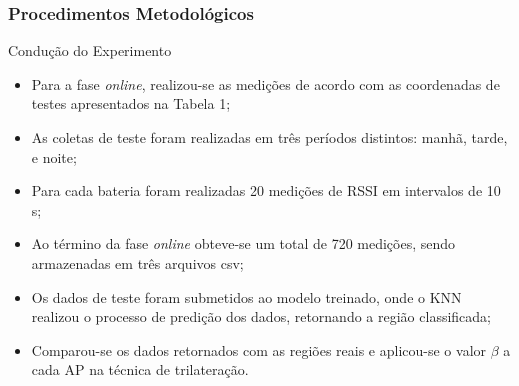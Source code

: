 \documentclass[xcolor={dvipsnames,svgnames,table}]{beamer}
\begin{document}
	\begin{frame}
		\frametitle{Procedimentos Metodológicos}	
		\begin{block}{Condução do Experimento}
			\begin{itemize}[label=\textcolor{black}{\textbullet}, left=5pt]
				\justifying
				\item Para a fase \textit{online}, realizou-se as medições de acordo com as coordenadas de testes apresentados na Tabela 1;%
				\item As coletas de teste foram realizadas em três períodos distintos: manhã, tarde, e noite;
				\item Para cada bateria foram realizadas 20 medições de RSSI em intervalos de 10 s;
				\item Ao término da fase \textit{online} obteve-se um total de 720 medições, sendo armazenadas em três arquivos csv;%
				\item Os dados de teste foram submetidos ao modelo treinado, onde o KNN realizou o processo de predição dos dados, retornando a região classificada;
				\item Comparou-se os dados retornados com as regiões reais e aplicou-se o valor $\beta$ a cada AP na técnica de trilateração.
			\end{itemize}
		\end{block}
	\end{frame}%
	
\end{document}
